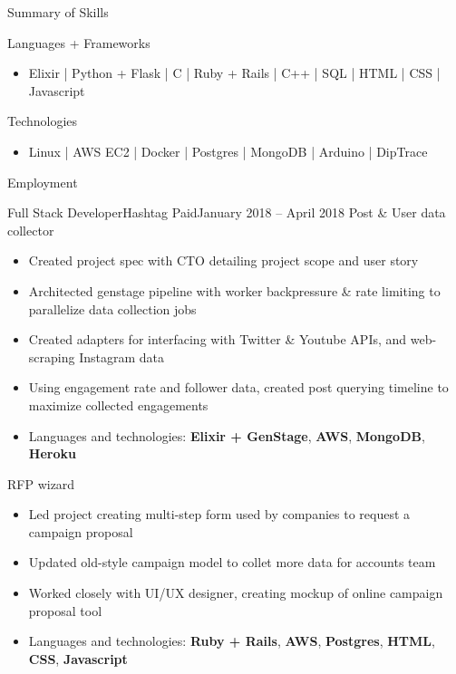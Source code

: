 \documentclass[calibri]{mcdowellcv}
\begin{document}
    \makeheader

    \begin{cvsection}{\Large{Summary of Skills}}
        \begin{cvsubsection}{Languages + Frameworks}{}{}
            \begin{itemize}
                \item Elixir | Python + Flask | C | Ruby + Rails | C++ | SQL | HTML | CSS | Javascript
            \end{itemize}
        \end{cvsubsection}
        \begin{cvsubsection}{Technologies}{}{}
            \begin{itemize}
                \item Linux | AWS EC2 | Docker | Postgres | MongoDB | Arduino | DipTrace
            \end{itemize}
        \end{cvsubsection}
    \end{cvsection}

    \begin{cvsection}{\Large{Employment}}
        \begin{cvsubsection}{Full Stack Developer}{Hashtag Paid}{January 2018 -- April 2018}
            Post \& User data collector
            \begin{itemize}
                \item Created project spec with CTO detailing project scope and user story
                \item Architected genstage pipeline with worker backpressure \& rate limiting to parallelize data collection jobs
                \item Created adapters for interfacing with Twitter \& Youtube APIs, and web-scraping Instagram data
                \item Using engagement rate and follower data, created post querying timeline to maximize collected engagements
                \item Languages and technologies: \textbf{Elixir + GenStage}, \textbf{AWS}, \textbf{MongoDB}, \textbf{Heroku}
            \end{itemize}

            RFP wizard
            \begin{itemize}
                \item Led project creating multi-step form used by companies to request a campaign proposal
                \item Updated old-style campaign model to collet more data for accounts team
                \item Worked closely with UI/UX designer, creating mockup of online campaign proposal tool
                \item Languages and technologies: \textbf{Ruby + Rails}, \textbf{AWS}, \textbf{Postgres}, \textbf{HTML}, \textbf{CSS}, \textbf{Javascript}
            \end{itemize}
        \end{cvsubsection}
    \end{cvsection}
\end{document}
